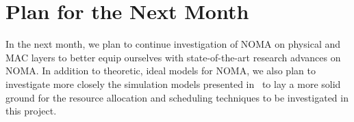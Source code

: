 

\section{Plan for the Next Month}
\label{sec_futureWork}

In the next month, we plan to continue investigation of NOMA on physical and MAC layers to better 
equip ourselves with state-of-the-art research advances on NOMA. In addition to theoretic, ideal models
for NOMA, we also plan to investigate more closely the simulation models presented in~\cite{cite_bell1} to lay a
more solid ground for
the resource allocation and scheduling techniques to be investigated in this project.



